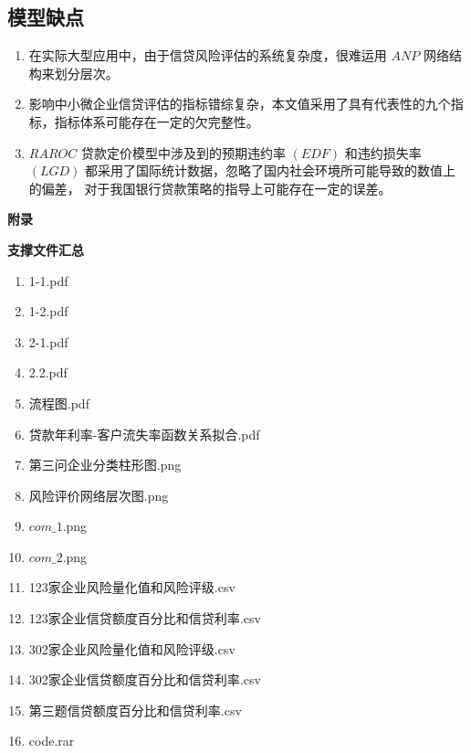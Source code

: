 \documentclass[withoutpreface,bwprint]{cumcmthesis}
\begin{document}
    \subsection{模型缺点}
    \begin{enumerate}
        \item 在实际大型应用中，由于信贷风险评估的系统复杂度，很难运用 $ANP$ 网络结构来划分层次。
        \item 影响中小微企业信贷评估的指标错综复杂，本文值采用了具有代表性的九个指标，指标体系可能存在一定的欠完整性。
        \item $RAROC$ 贷款定价模型中涉及到的预期违约率 $(EDF)$ 和违约损失率 $(LGD)$ 都采用了国际统计数据，忽略了国内社会环境所可能导致的数值上的偏差，
              对于我国银行贷款策略的指导上可能存在一定的误差。
    \end{enumerate}
    
    
    
    \newpage
    \appendix
    {\Large\textbf{附录}}\par
    \textbf{支撑文件汇总}
    \begin{enumerate}
        \item 1-1.pdf
        \item 1-2.pdf
        \item 2-1.pdf
        \item 2.2.pdf
        \item 流程图.pdf
        \item 贷款年利率-客户流失率函数关系拟合.pdf
        \item 第三问企业分类柱形图.png
        \item 风险评价网络层次图.png
        \item $com\_1$.png
        \item $com\_2$.png
        \item 123家企业风险量化值和风险评级.csv
        \item 123家企业信贷额度百分比和信贷利率.csv
        \item 302家企业风险量化值和风险评级.csv
        \item 302家企业信贷额度百分比和信贷利率.csv
        \item 第三题信贷额度百分比和信贷利率.csv
        \item code.rar
    \end{enumerate}
    
\end{document}

